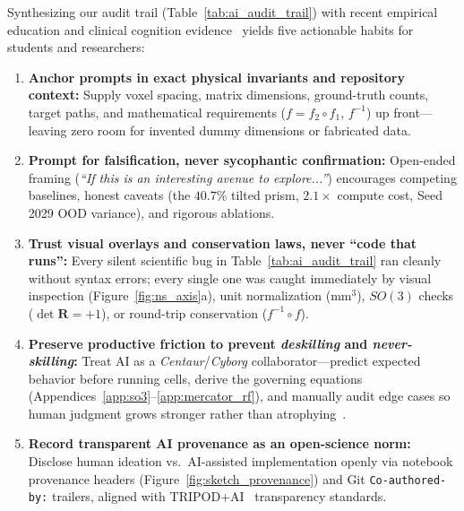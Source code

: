 \documentclass[10pt,a4paper]{article}
\renewcommand{\_}{\origunderscore\allowbreak}
\begin{document}
\begin{insightbox}
Synthesizing our audit trail (Table~\ref{tab:ai_audit_trail}) with recent empirical education and clinical cognition evidence~\cite{bastani2025pnas,kestin2025scirep,ke2026neverskilling,budzyn2025deskilling,griot2025metacognition,mollick2026coexistence} yields five actionable habits for students and researchers:
\begin{enumerate}[itemsep=1.5pt, topsep=2pt]
    \item \textbf{Anchor prompts in exact physical invariants and repository context:} Supply voxel spacing, matrix dimensions, ground-truth counts, target paths, and mathematical requirements ($f = f_2 \circ f_1$, $f^{-1}$) up front---leaving zero room for invented dummy dimensions or fabricated data.
    \item \textbf{Prompt for falsification, never sycophantic confirmation:} Open-ended framing (\textit{``If this is an interesting avenue to explore...''}) encourages competing baselines, honest caveats (the $40.7\%$ tilted prism, $2.1\times$ compute cost, Seed 2029 OOD variance), and rigorous ablations.
    \item \textbf{Trust visual overlays and conservation laws, never ``code that runs'':} Every silent scientific bug in Table~\ref{tab:ai_audit_trail} ran cleanly without syntax errors; every single one was caught immediately by visual inspection (Figure~\ref{fig:ns_axis}a), unit normalization ($\text{mm}^3$), $SO(3)$ checks ($\det\mathbf{R}=+1$), or round-trip conservation ($f^{-1}\circ f$).
    \item \textbf{Preserve productive friction to prevent \emph{deskilling} and \emph{never-skilling}:} Treat AI as a \emph{Centaur}/\emph{Cyborg} collaborator---predict expected behavior before running cells, derive the governing equations (Appendices~\ref{app:so3}--\ref{app:mercator_rf}), and manually audit edge cases so human judgment grows stronger rather than atrophying~\cite{bjork2011desirable,ke2026neverskilling,budzyn2025deskilling}.
    \item \textbf{Record transparent AI provenance as an open-science norm:} Disclose human ideation vs.\ AI-assisted implementation openly via notebook provenance headers (Figure~\ref{fig:sketch_provenance}) and Git \texttt{Co-authored-by:} trailers, aligned with TRIPOD+AI~\cite{collins2024tripodai} transparency standards.
\end{enumerate}
\end{insightbox}
\end{document}

